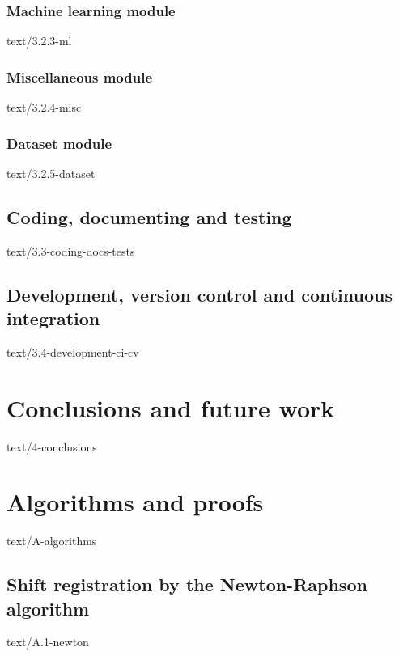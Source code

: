 \documentclass[epsbased,copyleft,final,loe, lof,extendedindex,firstnumbered,tfg,covers,english]{tfgtfmthesisuam}
\begin{document}
  \subsection{Machine learning module\label{SEC:MLMOD}}{text/3.2.3-ml}
  \subsection{Miscellaneous module\label{SEC:MISCMOD}}{text/3.2.4-misc}
  \subsection{Dataset module\label{SEC:DATAMOD}}{text/3.2.5-dataset}
\section{Coding, documenting and testing\label{SEC:CODING}}{text/3.3-coding-docs-tests}
\section{Development, version control and continuous integration\label{SEC:DEVELOPMENT}}{text/3.4-development-ci-cv}

\chapter{Conclusions and future work\label{CAP:CONCLUSIONS}}{text/4-conclusions}

\appendix

\chapter{Algorithms and proofs\label{CAP:ALGORITHMS}}{text/A-algorithms}
  \section{Shift registration by the Newton-Raphson algorithm\label{SEC:NEWTON}}{text/A.1-newton}
\end{document}
